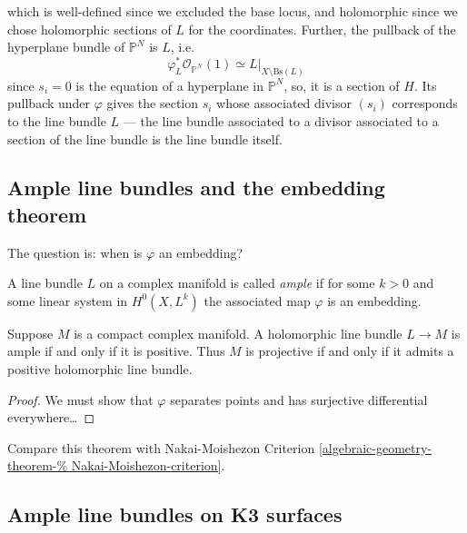 \noindent
which is well-defined since we excluded
the base locus,
and holomorphic since we chose holomorphic
sections of $L$ for the coordinates.
Further, the pullback of the hyperplane
bundle of $\mathbb{P}^N$ is $L$,
i.e.
$$
\varphi^*_L \mathcal{O}_{\mathbb{P}^N}(1)
\simeq L|_{X\setminus\text{Bs}(L)}
$$
since $s_i=0$ is the equation of a hyperplane
in $\mathbb{P}^N$,
so, it is a section of $H$.
Its pullback under $\varphi$ gives the
section $s_i$
whose associated divisor $(s_i)$
corresponds to the line bundle $L$ ---
the line bundle associated to a divisor
associated to a section of the line bundle
is the line bundle itself.

\subsection{Ample line bundles and the
embedding
theorem}
\label{subsection-ample-embedding}

\medskip\noindent
The question is: when is $\varphi$ an
embedding?

\begin{definition}
\label{definition-ample}
\begin{reference}
\cite[Definition 2.3.28]{huc}
\end{reference}
A line bundle $L$ on a complex manifold is
called {\it ample} if for some $k>0$
and some linear system in $H^{0}(X,L^k)$ the
associated map $\varphi$ is an
embedding.
\end{definition}

\begin{theorem}
\label{theorem-Kodaira-embedding}
\begin{reference}
\cite[Theorem 10.12]{lec}
\end{reference}
Suppose $M$ is a compact complex manifold.
A holomorphic line bundle $L\to M$ is
ample if and only if it is positive.
Thus $M$ is projective if and only if it
admits a positive holomorphic line bundle.
\end{theorem}

\begin{proof}
We must show that $\varphi$ separates points
and has
surjective differential everywhere…
\end{proof}

\noindent
Compare this theorem with Nakai-Moishezon
Criterion
\ref{algebraic-geometry-theorem-%
Nakai-Moishezon-criterion}.

\subsection{Ample line bundles on K3
surfaces}
\label{subsection-ample-k3}

